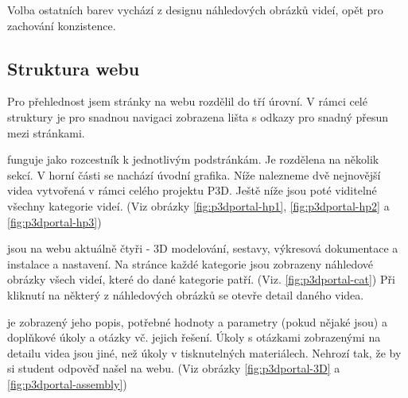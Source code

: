 Volba ostatních barev vychází z designu náhledových obrázků videí, opět pro zachování konzistence.

\subsection{Struktura webu}
Pro přehlednost jsem stránky na webu rozdělil do tří úrovní. 
V rámci celé struktury je pro snadnou navigaci zobrazena lišta s odkazy pro snadný přesun mezi stránkami.

\noindent{} funguje jako rozcestník k jednotlivým podstránkám. Je rozdělena na několik sekcí. V horní části se nachází úvodní grafika. Níže nalezneme dvě nejnovější videa vytvořená v rámci celého projektu P3D. Ještě níže jsou poté viditelné všechny kategorie videí. (Viz obrázky \ref{fig:p3dportal-hp1}, \ref{fig:p3dportal-hp2} a \ref{fig:p3dportal-hp3})

\noindent{} jsou na webu aktuálně čtyři - 3D modelování, sestavy, výkresová dokumentace a instalace a nastavení. Na stránce každé kategorie jsou zobrazeny náhledové obrázky všech videí, které do dané kategorie patří. (Viz. \autoref{fig:p3dportal-cat})
Při kliknutí na některý z náhledových obrázků se otevře detail daného videa. 

\noindent{} je zobrazený jeho popis, potřebné hodnoty a parametry (pokud nějaké jsou) a doplňkové úkoly a otázky vč. jejich řešení. Úkoly s otázkami zobrazenými na detailu videa jsou jiné, než úkoly v tisknutelných materiálech. Nehrozí tak, že by si student odpověď našel na webu. (Viz obrázky \ref{fig:p3dportal-3D} a \ref{fig:p3dportal-assembly})

